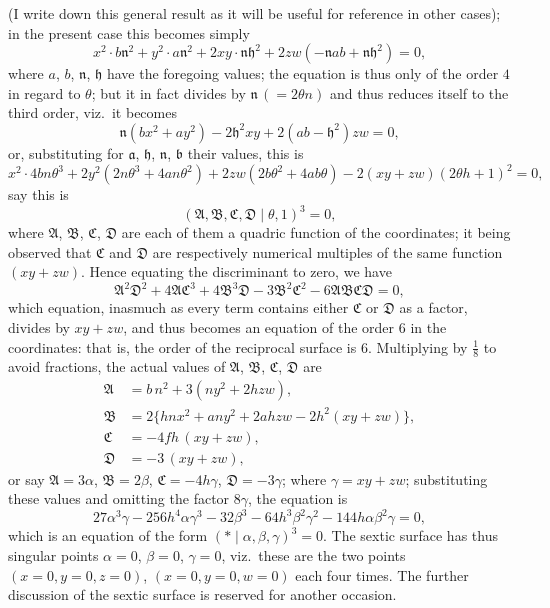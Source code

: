 \documentclass[11pt,a4paper]{article}
\providecommand{\midbar}{\mid}
\begin{document}
(I write down this general result as it will be useful for reference in
other cases); in the present case this becomes simply
\[
x^{2} \cdot b \mathfrak{n}^{2} + y^{2} \cdot a \mathfrak{n}^{2}
+ 2 x y \cdot \mathfrak{n}\mathfrak{h}^{2}
+ 2 z w (-\mathfrak{n} a b + \mathfrak{n}\mathfrak{h}^{2}) = 0,
\]
where $a$, $b$, $\mathfrak{n}$, $\mathfrak{h}$ have the foregoing values;
the equation is thus only of the order $4$ in regard to $\theta$; but it
in fact divides by $\mathfrak{n}\,(= 2 \theta n)$ and thus reduces itself
to the third order, viz.\ it becomes
\[
\mathfrak{n} (b x^{2} + a y^{2}) - 2 \mathfrak{h}^{2} x y
+ 2 (a b - \mathfrak{h}^{2}) z w = 0,
\]
or, substituting for $\mathfrak{a}$, $\mathfrak{h}$, $\mathfrak{n}$,
$\mathfrak{b}$ their values, this is
\[
x^{2} \cdot 4 b n \theta^{3} + 2 y^{2} (2 n \theta^{3} + 4 a n \theta^{2})
+ 2 z w (2 b \theta^{2} + 4 a b \theta) - 2 (x y + z w)(2 \theta h + 1)^{2}
= 0,
\]
say this is
\[
(\mathfrak{A}, \mathfrak{B}, \mathfrak{C}, \mathfrak{D}\!\midbar\!
\theta, 1)^{3} = 0,
\]
where $\mathfrak{A}$, $\mathfrak{B}$, $\mathfrak{C}$, $\mathfrak{D}$ are
each of them a quadric function of the coordinates; it being observed that
$\mathfrak{C}$ and $\mathfrak{D}$ are respectively numerical multiples of
the same function $(xy + zw)$. Hence equating the discriminant to zero,
we have
\[
\mathfrak{A}^{2} \mathfrak{D}^{2}
+ 4 \mathfrak{A}\mathfrak{C}^{3}
+ 4 \mathfrak{B}^{3}\mathfrak{D}
- 3 \mathfrak{B}^{2}\mathfrak{C}^{2}
- 6 \mathfrak{A}\mathfrak{B}\mathfrak{C}\mathfrak{D} = 0,
\]
which equation, inasmuch as every term contains either $\mathfrak{C}$ or
$\mathfrak{D}$ as a factor, divides by $xy + zw$, and thus becomes an
equation of the order $6$ in the coordinates: that is, the order of the
reciprocal surface is $6$. Multiplying by $\tfrac{1}{8}$ to avoid
fractions, the actual values of $\mathfrak{A}$, $\mathfrak{B}$,
$\mathfrak{C}$, $\mathfrak{D}$ are
\[
\begin{aligned}
\mathfrak{A} &= b\,n^{2} + 3 (n y^{2} + 2 h z w),\\
\mathfrak{B} &= 2 \{ h n x^{2} + a n y^{2} + 2 a h z w - 2 h^{2}(xy + zw)\},\\
\mathfrak{C} &= -4 f h\,(x y + z w),\\
\mathfrak{D} &= -3\,(x y + z w),
\end{aligned}
\]
or say $\mathfrak{A} = 3 \alpha$, $\mathfrak{B} = 2 \beta$,
$\mathfrak{C} = -4 h \gamma$, $\mathfrak{D} = -3 \gamma$; where
$\gamma = xy + zw$; substituting these values and omitting the factor
$8 \gamma$, the equation is
\[
27 \alpha^{3} \gamma - 256 h^{4} \alpha \gamma^{3}
- 32 \beta^{3}
- 64 h^{3} \beta^{2} \gamma^{2}
- 144 h \alpha \beta^{2} \gamma = 0,
\]
which is an equation of the form $(*\!\midbar\! \alpha, \beta, \gamma)^{3}
= 0$. The sextic surface has thus singular points $\alpha = 0$,
$\beta = 0$, $\gamma = 0$, viz.\ these are the two points
$(x = 0, y = 0, z = 0)$, $(x = 0, y = 0, w = 0)$ each four times. The
further discussion of the sextic surface is reserved for another occasion.
\end{document}
